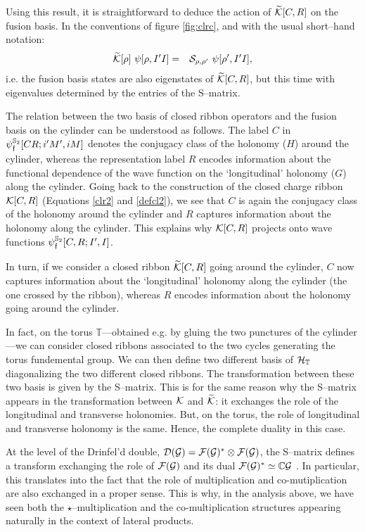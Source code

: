 \documentclass[nofootinbib,superscriptaddress,eqsecnum,tightenlines,11pt]{revtex4-1}
\def\mG{\mathcal{G}}
\def\ba{\begin{eqnarray}}
\def\ea{\end{eqnarray}}
\renewcommand{\S}{{\mathbb S}}
\renewcommand{\tilde}{\widetilde}
\begin{document}
Using this result, it is straightforward to deduce the action of $\tilde{\cal K}[C,R]$ on the fusion basis. In the conventions of figure \ref{fig:clrc}, and with the usual short--hand notation:
\ba
\tilde {\cal K}[\rho]\, \,\psi[\rho, I' I] &=& {\cal S}_{\rho,\rho'} \,\,\psi[\rho', I' I] ,
\ea
i.e. the fusion basis states are also eigenstates of $\tilde{\cal K}[C,R]$, but this time with eigenvalues determined by the entries of the S--matrix. 


The relation between the two basis of closed ribbon operators and the fusion basis on the cylinder can be understood as follows.
The label $C$ in  $\psi^{\S_2}_{\frak f}[C R;i'M',iM]$ denotes the conjugacy class of the holonomy ($H$) around the cylinder, whereas the representation label $R$ encodes information about the functional dependence of the wave function on the `longitudinal' holonomy ($G$) along the cylinder. 
Going back to the construction of the  closed charge ribbon ${\cal K}[C,R]$ (Equations \eqref{clr2} and \eqref{defcl2}), we see that $C$ is again the conjugacy class of the holonomy around the cylinder and $R$ captures information about the holonomy along the cylinder. 
This explains why ${\cal K}[C,R]$ projects onto wave functions $\psi^{\S_2}_{\frak f}[C,R; I', I]$.

In turn, if we consider a closed ribbon $\tilde{\cal K}[C,R]$ 
going around the cylinder, $C$ now captures information about the `longitudinal' holonomy along the cylinder (the one crossed by the ribbon), whereas $R$ encodes information about the holonomy going around the cylinder. 

In fact, on the torus $\mathbb T$---obtained e.g. by gluing the two punctures of the cylinder---we can consider closed ribbons associated to the two cycles generating the torus fundemental group.
We can then define two different basis of ${\cal H}_{\mathbb T}$ diagonalizing the two different closed ribbons. 
The transformation between these two basis is given by the S--matrix.
This is for the same reason why the S--matrix appears in the transformation between ${\cal K}$ and $\tilde {\cal K}$: it exchanges the role of the longitudinal and transverse holonomies.
But, on the torus, the role of longitudinal and transverse holonomy is the same.
Hence, the complete duality in this case.

At the level of the Drinfel'd double, ${\cal D}(\mG) = {\cal F}(\mG)^\ast  \otimes {\cal F}(\mG) $, the S--matrix defines a transform exchanging the role of ${\cal F}(\mG)$ and its dual    $  {\cal F}(\mG)^\ast  \simeq {\mathbb C}{\mathcal G}$ \cite{KoornFT}.
In particular, this translates into the fact that the role of multiplication and co-mutiplication are also exchanged in a proper sense.
This is why, in the analysis above, we have seen both the $\star$--multiplication and the co-multiplication structures appearing naturally in the context of lateral products.
\end{document}
